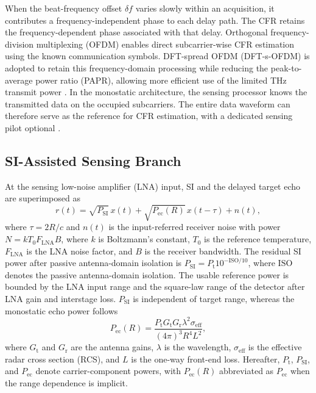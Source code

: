 \documentclass[10pt,journal]{IEEEtran}
\DeclareRobustCommand{\rev}[1]{\textcolor{revisioncolor}{#1}}
\begin{document}
\rev{When the beat-frequency offset $\delta f$ varies slowly within an
acquisition, it contributes a frequency-independent phase to each
delay path. The CFR retains the frequency-dependent phase associated
with that delay.} Orthogonal frequency-division multiplexing (OFDM) enables direct
subcarrier-wise CFR estimation using the known communication symbols.
DFT-spread OFDM (DFT-s-OFDM) is adopted to retain this
frequency-domain processing while reducing the peak-to-average power
ratio (PAPR), allowing more efficient use of the limited THz transmit
power \cite{han_thz_2024}. \rev{In the monostatic architecture, the sensing processor knows the
transmitted data on the occupied subcarriers. The entire data waveform
can therefore serve as the reference for CFR estimation, with a
dedicated sensing pilot optional \cite{keskin_monostatic_2023}.}


\subsection{SI-Assisted Sensing Branch}
\label{sec:sens_branch}

At the sensing low-noise amplifier (LNA) input, SI and the delayed target
echo are superimposed as
\begin{equation}
r(t)=\sqrt{P_{\mathrm{SI}}}\,x(t)
+\sqrt{P_{\mathrm{ec}}(R)}\,x(t-\tau)+n(t),
\label{eq:rt}
\end{equation}
where $\tau=2R/c$ and $n(t)$ is the input-referred receiver noise with
power $N=kT_0F_{\mathrm{LNA}}B$, where $k$ is Boltzmann's constant,
$T_0$ is the reference temperature, $F_{\mathrm{LNA}}$ is the LNA noise
factor, and $B$ is the receiver bandwidth. The residual SI power after
passive antenna-domain isolation is
$P_{\mathrm{SI}}=P_{\mathrm t}10^{-\mathrm{ISO}/10}$, where
$\mathrm{ISO}$ denotes the passive antenna-domain isolation.
\rev{The usable reference power is bounded by the LNA input range and the
square-law range of the detector after LNA gain and interstage loss.}
$P_{\mathrm{SI}}$ is independent of target range, whereas the monostatic
echo power follows \cite{skolnik_introduction_2001}
\begin{equation}
P_{\mathrm{ec}}(R)=
\frac{P_{\mathrm t}G_{\mathrm t}G_{\mathrm r}
\lambda^2\sigma_{\mathrm{eff}}}
{(4\pi)^3R^4L^2},
\label{eq:pec}
\end{equation}
where $G_{\mathrm t}$ and $G_{\mathrm r}$ are the antenna gains,
$\lambda$ is the wavelength, $\sigma_{\mathrm{eff}}$ is the effective
radar cross section (RCS), and $L$ is the one-way front-end loss.
Hereafter, $P_{\mathrm t}$, $P_{\mathrm{SI}}$, and $P_{\mathrm{ec}}$
denote carrier-component powers, with $P_{\mathrm{ec}}(R)$ abbreviated
as $P_{\mathrm{ec}}$ when the range dependence is implicit.
\end{document}
